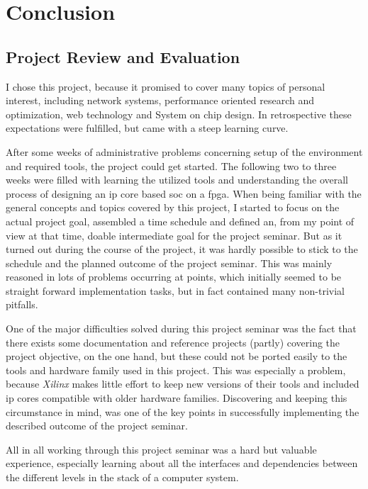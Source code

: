 \chapter{Conclusion}

\section{Project Review and Evaluation}

I chose this project, because it promised to cover many topics of personal interest, including network systems, performance oriented research and optimization, web technology and System on chip design. In retrospective these expectations were fulfilled, but came with a steep learning curve.

After some weeks of administrative problems concerning setup of the environment and required tools, the project could get started. The following two to three weeks were filled with learning the utilized tools and understanding the overall process of designing an \gls{ip} core based \gls{soc} on a \gls{fpga}. When being familiar with the general concepts and topics covered by this project, I started to focus on the actual project goal, assembled a time schedule and defined an, from my point of view at that time, doable intermediate goal for the project seminar. But as it turned out during the course of the project, it was hardly possible to stick to the schedule and the planned outcome of the project seminar. This was mainly reasoned in lots of problems occurring at points, which initially seemed to be straight forward implementation tasks, but in fact contained many non-trivial pitfalls. 

One of the major difficulties solved during this project seminar was the fact that there exists some documentation and reference projects (partly) covering the project objective, on the one hand, but these could not be ported easily to the tools and hardware family used in this project. This was especially a problem, because \textit{Xilinx} makes little effort to keep new versions of their tools and included \gls{ip} cores compatible with older hardware families. Discovering and keeping this circumstance in mind, was one of the key points in successfully implementing the described outcome of the project seminar.

All in all working through this project seminar was a hard but valuable experience, especially learning about all the interfaces and dependencies between the different levels in the stack of a computer system.

